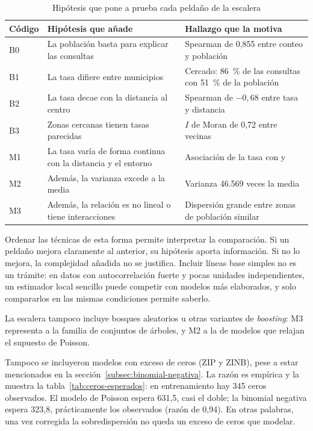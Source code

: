 \begin{table}[H]
  \centering
  \caption{Hipótesis que pone a prueba cada peldaño de la escalera}
  \label{tab:hipotesis-escalera}
  \interlineadoSimple
  \small
  \begin{tabularx}{\textwidth}{@{}L{0.08\textwidth}YL{0.33\textwidth}@{}}
    \toprule
    \textbf{Código} & \textbf{Hipótesis que añade} & \textbf{Hallazgo que la motiva} \\
    \midrule
    B0 & La población basta para explicar las consultas & Spearman de 0,855 entre conteo y población \\
    B1 & La tasa difiere entre municipios & Cercado: 86~\% de las consultas con 51~\% de la población \\
    B2 & La tasa decae con la distancia al centro & Spearman de $-0{,}68$ entre tasa y distancia \\
    B3 & Zonas cercanas tienen tasas parecidas & $I$ de Moran de 0,72 entre vecinas \\
    M1 & La tasa varía de forma continua con la distancia y el entorno & Asociación de la tasa con  y  \\
    M2 & Además, la varianza excede a la media & Varianza 46.569 veces la media \\
    M3 & Además, la relación es no lineal o tiene interacciones & Dispersión grande entre zonas de población similar \\
    \bottomrule
  \end{tabularx}
\end{table}

Ordenar las técnicas de esta forma permite interpretar la comparación. Si un peldaño mejora
claramente al anterior, su hipótesis aporta información. Si no lo mejora, la complejidad
añadida no se justifica. Incluir líneas base simples no es un trámite: en datos con
autocorrelación fuerte y pocas unidades independientes, un estimador local sencillo puede
competir con modelos más elaborados, y solo compararlos en las mismas condiciones permite
saberlo.

La escalera tampoco incluye bosques aleatorios u otras variantes de \emph{boosting}: M3
representa a la familia de conjuntos de árboles, y M2 a la de modelos que relajan el
supuesto de Poisson.

Tampoco se incluyeron modelos con exceso de ceros (ZIP y ZINB), pese a estar mencionados en
la sección~\ref{subsec:binomial-negativa}. La razón es empírica y la muestra la
tabla~\ref{tab:ceros-esperados}: en entrenamiento hay 345 ceros observados. El modelo de
Poisson espera 631,5, casi el doble; la binomial negativa espera 323,8, prácticamente los
observados (razón de 0,94). En otras palabras, una vez corregida la sobredispersión no queda
un exceso de ceros que modelar.

